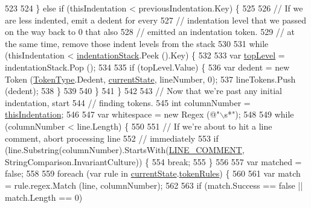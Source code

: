 \begin{DoxyCode}
523 
524             \} \textcolor{keywordflow}{else} \textcolor{keywordflow}{if} (thisIndentation < previousIndentation.Key) \{
525 
526                 \textcolor{comment}{// If we are less indented, emit a dedent for every}
527                 \textcolor{comment}{// indentation level that we passed on the way back to 0 that also}
528                 \textcolor{comment}{// emitted an indentation token.}
529                 \textcolor{comment}{// at the same time, remove those indent levels from the stack}
530 
531                 \textcolor{keywordflow}{while} (thisIndentation < \hyperlink{a00127_a6631a1b1a9109258ab18927e7587ff9b}{indentationStack}.Peek ().Key) \{
532 
533                     var \hyperlink{a00348_a8b7e5c0b2c6870eaa8f9454b4f33678b}{topLevel} = indentationStack.Pop ();
534 
535                     \textcolor{keywordflow}{if} (topLevel.Value) \{
536                         var dedent = \textcolor{keyword}{new} Token (\hyperlink{a00051_a301aa7c866593a5b625a8fc158bbeace}{TokenType}.Dedent, 
      \hyperlink{a00127_ac90b7dce8103425a148f9e8588f14137}{currentState}, lineNumber, 0);
537                         lineTokens.Push (dedent);
538                     \}
539 
540                 \}
541             \}
542 
543             \textcolor{comment}{// Now that we're past any initial indentation, start}
544             \textcolor{comment}{// finding tokens.}
545             \textcolor{keywordtype}{int} columnNumber = \hyperlink{a00348_a0e59365a4aa5811f6495b92a51e23573}{thisIndentation};
546 
547             var whitespace = \textcolor{keyword}{new} Regex (\textcolor{stringliteral}{@"\(\backslash\)s*"});
548 
549             \textcolor{keywordflow}{while} (columnNumber < line.Length) \{
550 
551                 \textcolor{comment}{// If we're about to hit a line comment, abort processing line}
552                 \textcolor{comment}{// immediately}
553                 \textcolor{keywordflow}{if} (line.Substring(columnNumber).StartsWith(\hyperlink{a00127_a29c457125cc4876f8571f5d9afa372e2}{LINE\_COMMENT}, 
      StringComparison.InvariantCulture)) \{
554                     \textcolor{keywordflow}{break};
555                 \}
556 
557                 var matched = \textcolor{keyword}{false};
558 
559                 \textcolor{keywordflow}{foreach} (var rule \textcolor{keywordflow}{in} \hyperlink{a00127_ac90b7dce8103425a148f9e8588f14137}{currentState}.\hyperlink{a00128_adf6563b1dc6f3ef80ed13c2b15b7be03}{tokenRules}) \{
560 
561                     var match = rule.regex.Match (line, columnNumber);
562 
563                     \textcolor{keywordflow}{if} (match.Success == \textcolor{keyword}{false} || match.Length == 0)

\end{DoxyCode}
